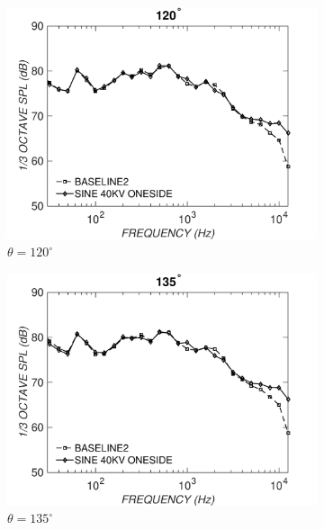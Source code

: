 \begin{figure}
\begin{subfigure}{0.32\textwidth}
\includegraphics[width=\linewidth]{figures/octave1202}
\caption{$\theta=120^\circ$}
\label{fig:octave1202}
\end{subfigure}
\hspace*{\fill} %
\begin{subfigure}{0.32\textwidth}
\includegraphics[width=\linewidth]{figures/octave1352}
\caption{$\theta=135^\circ$}
\label{fig:octave1352}
\end{subfigure}
\hspace*{\fill} %
\begin{subfigure}{0.32\textwidth}

\end{subfigure}
\end{figure}
